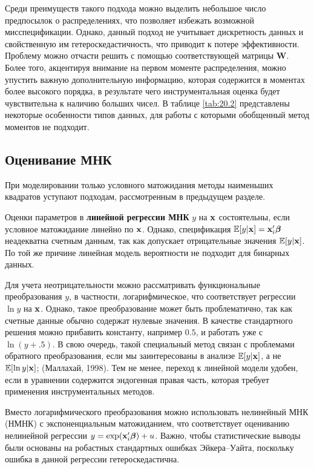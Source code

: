 Среди преимуществ такого подхода можно выделить небольшое число предпосылок о распределениях, что позволяет избежать возможной мисспецификации. Однако, данный подход не учитывает дискретность данных и свойственную им гетероскедастичность, что приводит к потере эффективности. Проблему можно отчасти решить с помощью соответствующей матрицы $\mathbf{W}$. Более того, акцентируя внимание на первом моменте распределения, можно упустить важную дополнительную информацию, которая содержится в моментах более высокого порядка, в результате чего инструментальная оценка будет чувствительна к наличию больших чисел. В таблице \ref{tab:20.2} представлены некоторые особенности типов данных, для работы с которыми обобщенный метод моментов не подходит.


\subsection{Оценивание МНК}\label{sec:20.5.2}

\noindent
При моделировании только условного матожидания методы наименьших квадратов уступают подходам, рассмотренным в предыдущем разделе.

Оценки параметров в \textbf{линейной регрессии МНК} $y$ на $\mathbf{x}$ состоятельны, если условное матожидание линейно по $\mathbf{x}$. Однако, спецификация $\mathbb{E}[y|\mathbf{x}] = \mathbf{x}_i'\bm{\beta}$ неадекватна счетным данным, так как допускает отрицательные значения $\mathbb{E}[y|\mathbf{x}]$. По той же причине линейная модель вероятности не подходит для бинарных данных.

Для учета неотрицательности можно рассматривать функциональные преобразования $y$, в частности, логарифмическое, что соответствует регрессии $\ln y$ на $\mathbf{x}$. Однако, такое преобразование может быть проблематично, так как счетные данные обычно содержат нулевые значения. В качестве стандартного решения можно прибавить константу, например $0.5$, и работать уже с $\ln (y + .5)$. В свою очередь, такой специальный метод связан с проблемами обратного преобразования, если мы заинтересованы в анализе $\mathbb{E}[y|\mathbf{x}]$, а не $\mathbb{E}[\ln y|\mathbf{x}]$; (Маллахай, 1998).
Тем не менее, переход к линейной модели удобен, если в уравнении содержится эндогенная правая часть, которая требует применения инструментальных методов.

Вместо логарифмического преобразования можно использовать нелинейный МНК (НМНК) с экспоненциальным матожиданием, что соответствует оцениванию нелинейной регрессии $y = \exp(\mathbf{x}_i'\bm{\beta}) + u$. Важно, чтобы статистические выводы были основаны на робастных стандартных ошибках Эйкера--Уайта, поскольку ошибка в данной регрессии гетероскедастична.


